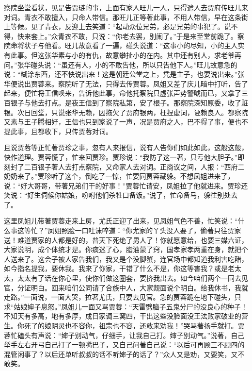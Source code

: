 \begin{parag}
    察院坐堂看状，见是告贾琏的事，上面有家人旺儿一人，只得遣人去贾府传旺儿来对词。青衣不敢擅入，只命人带信。那旺儿正等著此事，不用人带信，早在这条街上等候。见了青衣，反迎上去笑道：“起动众位兄弟，必是兄弟的事犯了。说不得，快来套上。”众青衣不敢，只说：“你老去罢，别闹了。”于是来至堂前跪了。察院命将状子与他看。旺儿故意看了一遍，碰头说道：“这事小的尽知，小的主人实有此事。但这张华素与小的有仇，故意攀扯小的在内。其中还有别人，求老爷再问。”张华碰头说：“虽还有人，小的不敢告他，所以只告他下人。”旺儿故意急的说：“糊涂东西，还不快说出来！这是朝廷公堂之上，凭是主子，也要说出来。”张华便说出贾蓉来。察院听了无法，只得去传贾蓉。凤姐又差了庆儿暗中打听，告了起来，便忙将王信唤来，告诉他此事，命他托察院只虚张声势警唬而已，又拿了三百银子与他去打点。是夜王信到了察院私第，安了根子。那察院深知原委，收了赃银。次日回堂，只说张华无赖，因拖欠了贾府银两，枉捏虚词，诬赖良人。都察院又素与王子腾相好，王信也只到家说了一声，况是贾府之人，巴不得了事，便也不提此事，且都收下，只传贾蓉对词。
\end{parag}


\begin{parag}
    且说贾蓉等正忙著贾珍之事，忽有人来报信，说有人告你们如此如此，这般这般，快作道理。贾蓉慌了，忙来回贾珍。贾珍说：“我防了这一著，只亏他大胆子。”即刻封了二百银子著人去打点察院，又命家人去对词。正商议之间，人报：“西府二奶奶来了。”贾珍听了这个，倒吃了一惊，忙要同贾蓉藏躲。不想凤姐进来了，说：“好大哥哥，带著兄弟们干的好事！”贾蓉忙请安，凤姐拉了他就进来。贾珍还笑说：“好生伺候你姑娘，吩咐他们杀牲口备饭。”说了，忙命备马，躲往别处去了。
\end{parag}


\begin{parag}
    这里凤姐儿带著贾蓉走来上房，尤氏正迎了出来，见凤姐气色不善，忙笑说：“什么事这等忙？”凤姐照脸一口吐沫啐道：“你尤家的丫头没人要了，偷著只往贾家送！难道贾家的人都是好的，普天下死绝了男人了！你就愿意给，也要三媒六证，大家说明，成个体统才是。你痰迷了心，脂油蒙了窍，国孝家孝两重在身，就把个人送来了。这会子被人家告我们，我又是个没脚蟹，连官场中都知道我利害吃醋，如今指名提我，要休我。我来了你家，干错了什么不是，你这等害我？或是老太太，太太有了话在你心里，使你们做这圈套，要挤我出去。如今咱们两个一同去见官，分证明白。回来咱们公同请了合族中人，大家觌面说个明白。给我休书，我就走路。”一面说，一面大哭，拉著尤氏，只要去见官。急的贾蓉跪在地下碰头，只求“姑娘婶子息怒。”凤姐儿一面又骂贾蓉：“天雷劈脑子五鬼分尸的没良心的种子！不知天有多高，地有多厚，成日家调三窝四，干出这些没脸面没王法败家破业的营生。你死了的娘阴灵也不容你，祖宗也不容，还敢来劝我！”哭骂著扬手就打。贾蓉忙磕头有声说：“婶子别动气，仔细手，让我自己打。婶子别动气。”说著，自己举手左右开弓自己打了一顿嘴巴子，又自己问著自己说：“以后可再顾三不顾四的混管闲事了？以后还单听叔叔的话不听婶子的话了？”众人又是劝，又要笑，又不敢笑。
\end{parag}


